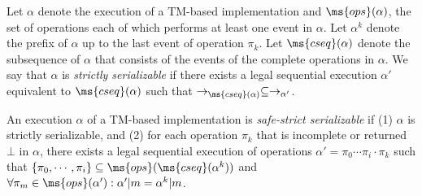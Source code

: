 \documentclass[11pt,pdftex,letterpaper]{article}
\begin{document}
Let $\alpha$ denote the execution of a TM-based implementation and
$\ms{ops}(\alpha)$, 
the set of operations each of which performs at least one event in $\alpha$.
Let ${\alpha}^k$ denote the prefix of $\alpha$ up to the last event of operation $\pi_k$.
Let $\ms{cseq}(\alpha)$ denote the subsequence of ${\alpha}$  that
consists of the events of the complete operations in $\alpha$. 
We say that $\alpha$ is \emph{strictly serializable} if 
there exists a legal sequential execution $\alpha'$ equivalent to
$\ms{cseq}(\alpha)$
such that $\rightarrow_{\ms{cseq}(\alpha)} \subseteq \rightarrow_{\alpha'}$. 

An execution $\alpha$ of a TM-based implementation is 
\emph{safe-strict serializable} if
(1) $\alpha$ is strictly serializable, and
(2) for each operation $\pi_k$ that is incomplete or returned $\bot$ in
$\alpha$, there exists a legal sequential execution of operations
$\alpha'=\pi_0\cdots \pi_i\cdot \pi_k$ such that $\{\pi_0,\cdots, \pi_i\}
\subseteq \ms{ops}(\ms{cseq}(\alpha^k))$ and $\forall \pi_m\in \ms{ops}(\alpha'):{\alpha'}|m={\alpha^k}|m$.
\end{document}
